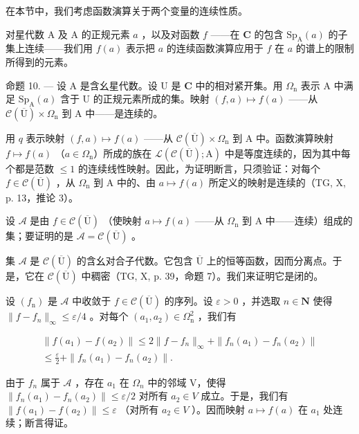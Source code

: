 在本节中，我们考虑函数演算关于两个变量的连续性质。

对星代数 A 及 A 的正规元素 \(a\) ，以及对函数 \(f\) ——在 \(\mathbf{C}\) 的包含 \(\mathrm{Sp}_{\mathrm{A}}(a)\) 的子集上连续——我们用 \(f(a)\) 表示把 \(a\) 的连续函数演算应用于 \(f\) 在 \(a\) 的谱上的限制所得到的元素。

命题 10. --- 设 A 是含幺星代数。设 U 是 \(\mathbf{C}\) 中的相对紧开集。用 \(\Omega_{\mathrm{n}}\) 表示 A 中满足 \(\mathrm{Sp}_{\mathrm{A}}(a)\) 含于 U 的正规元素所成的集。映射 \((f,a)\mapsto f(a)\) ——从 \(\mathcal{C}(\overline{\mathrm{U}})\times \Omega_{\mathrm{n}}\) 到 A 中——是连续的。

用 \(q\) 表示映射 \((f, a) \mapsto f(a)\) ——从 \(\mathcal{C}(\overline{\mathrm{U}}) \times \Omega_{\mathrm{n}}\) 到 A 中。函数演算映射 \(f \mapsto f(a)\) （\(a \in \Omega_{\mathrm{n}}\)）所成的族在 \(\mathcal{L}(\mathcal{C}(\overline{\mathrm{U}}); \mathrm{A})\) 中是等度连续的，因为其中每个都是范数 \(\leqslant 1\) 的连续线性映射。因此，为证明断言，只须验证：对每个 \(f \in \mathcal{C}(\overline{\mathrm{U}})\) ，从 \(\Omega_{\mathrm{n}}\) 到 A 中的、由 \(a \mapsto f(a)\) 所定义的映射是连续的（TG, X, p. 13，推论 3）。

设 \(\mathcal{A}\) 是由 \(f\in\mathcal{C}(\overline{\mathrm{U}})\) （使映射 \(a\mapsto f(a)\) ——从 \(\Omega_{\mathrm{n}}\) 到 A 中——连续）组成的集；要证明的是 \(\mathcal{A}=\mathcal{C}(\overline{\mathrm{U}})\) 。

集 \(\mathcal{A}\) 是 \(\mathcal{C}(\overline{\mathrm{U}})\) 的含幺对合子代数。它包含 \(\overline{\mathrm{U}}\) 上的恒等函数，因而分离点。于是，它在 \(\mathcal{C}(\overline{\mathrm{U}})\) 中稠密（TG, X, p. 39，命题 7）。我们来证明它是闭的。

设 \((f_{\mathrm{n}})\) 是 \(\mathcal{A}\) 中收敛于 \(f \in \mathcal{C}(\overline{\mathrm{U}})\) 的序列。设 \(\varepsilon > 0\) ，并选取 \(n \in \mathbf{N}\) 使得 \(\|f - f_{n}\|_{\infty} \leqslant \varepsilon/4\) 。对每个 \((a_{1}, a_{2}) \in \Omega_{\mathrm{n}}^{2}\) ，我们有

\[
\begin{array}{c} \| f (a _ {1}) - f (a _ {2}) \| \leqslant 2 \| f - f _ {n} \| _ {\infty} + \| f _ {n} (a _ {1}) - f _ {n} (a _ {2}) \| \\ \leqslant \frac {\varepsilon}{2} + \| f _ {n} (a _ {1}) - f _ {n} (a _ {2}) \|. \end{array}
\]

由于 \(f_n\) 属于 \(\mathcal{A}\) ，存在 \(a_1\) 在 \(\Omega_n\) 中的邻域 V，使得 \(\| f_n(a_1) - f_n(a_2) \| \leqslant \varepsilon / 2\) 对所有 \(a_2 \in V\) 成立。于是，我们有 \(\| f(a_1) - f(a_2) \| \leqslant \varepsilon\) （对所有 \(a_2 \in V\) ）。因而映射 \(a \mapsto f(a)\) 在 \(a_1\) 处连续；断言得证。

